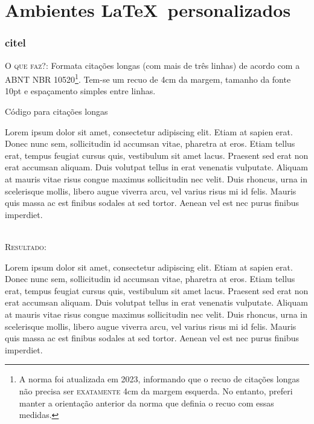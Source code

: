 \chapter{Ambientes \LaTeX\ personalizados}

\subsection{citel}

\textsc{O que faz?}: Formata citações longas (com mais de três linhas) de acordo com a ABNT NBR 10520\footnote{A norma foi atualizada em 2023, informando que o recuo de citações longas não precisa ser \textsc{exatamente} 4cm da margem esquerda. No entanto, preferi manter a orientação anterior da norma que definia o recuo com essas medidas.}. Tem-se um recuo de 4cm da margem, tamanho da fonte 10pt e espaçamento simples entre linhas.
\ \\

\begin{codex}{Código para citações longas}
	\begin{citel}
		Lorem ipsum dolor sit amet, consectetur adipiscing elit. Etiam at sapien erat. Donec nunc sem, sollicitudin id accumsan vitae, pharetra at eros. Etiam tellus erat, tempus feugiat cursus quis, vestibulum sit amet lacus. Praesent sed erat non erat accumsan aliquam. Duis volutpat tellus in erat venenatis vulputate. Aliquam at mauris vitae risus congue maximus sollicitudin nec velit. Duis rhoncus, urna in scelerisque mollis, libero augue viverra arcu, vel varius risus mi id felis. Mauris quis massa ac est finibus sodales at sed tortor. Aenean vel est nec purus finibus imperdiet.
	\end{citel}
\end{codex}
\ \\

\textsc{Resultado:}
\ \\

\begin{citel}
	Lorem ipsum dolor sit amet, consectetur adipiscing elit. Etiam at sapien erat. Donec nunc sem, sollicitudin id accumsan vitae, pharetra at eros. Etiam tellus erat, tempus feugiat cursus quis, vestibulum sit amet lacus. Praesent sed erat non erat accumsan aliquam. Duis volutpat tellus in erat venenatis vulputate. Aliquam at mauris vitae risus congue maximus sollicitudin nec velit. Duis rhoncus, urna in scelerisque mollis, libero augue viverra arcu, vel varius risus mi id felis. Mauris quis massa ac est finibus sodales at sed tortor. Aenean vel est nec purus finibus imperdiet.
\end{citel}

